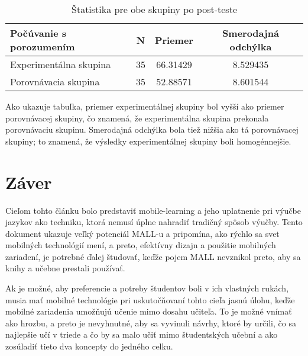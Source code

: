 \documentclass[10pt,oneside,slovak,a4paper]{article}
\begin{document}


\begin{table}[tbh]
\centering
\begin{tabular}{@{}|l|c|c|c|@{}}
\toprule
Počúvanie s porozumením & N  & Priemer  & Smerodajná odchýlka \\ \midrule
Experimentálna skupina  & 35 & 66.31429 & 8.529435            \\ \midrule
Porovnávacia skupina    & 35 & 52.88571 & 8.601544            \\ \bottomrule
\end{tabular}
\caption{\label{tab:Štatistika}Štatistika pre obe skupiny po post-teste}
\end{table}

Ako ukazuje tabuľka, priemer experimentálnej skupiny bol vyšší ako priemer porovnávacej skupiny, čo znamená, že experimentálna skupina prekonala porovnávaciu skupinu. Smerodajná odchýlka bola tiež nižšia ako tá porovnávacej skupiny; to znamená, že výsledky experimentálnej skupiny boli homogénnejšie.



\section{Záver} \label{zaver} %

Cieľom tohto článku bolo predstaviť mobile-learning a jeho uplatnenie pri výučbe jazykov ako techniku, ktorá nemusí úplne nahradiť tradičný spôsob výučby. Tento dokument ukazuje veľký potenciál MALL-u a pripomína, ako rýchlo sa svet mobilných technológií mení, a preto, efektívny dizajn a použitie mobilných zariadení, je potrebné ďalej študovať, keďže pojem MALL nevznikol preto, aby sa knihy a učebne prestali používať.

Ak je možné, aby preferencie a potreby študentov boli v ich vlastných rukách, musia mať mobilné technológie pri uskutočňovaní tohto cieľa jasnú úlohu, keďže mobilné zariadenia umožňujú učenie mimo dosahu učiteľa\cite{KukulskaHulme2009}. To je možné vnímať ako hrozbu, a preto je nevyhnutné, aby sa vyvinuli návrhy, ktoré by určili, čo sa najlepšie učí v triede a čo by sa malo učiť mimo študentských učební a ako zosúladiť tieto dva koncepty do jedného celku.




\end{document}
